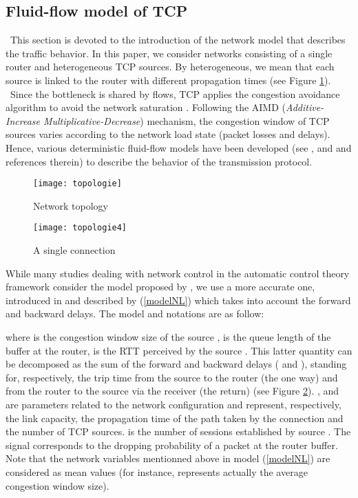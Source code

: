\documentclass[a4paper, 10pt, onecolumn]{article}
\begin{document}
\subsection{Fluid-flow model of TCP}
~\indent  This section is devoted to the introduction of the network model that describes the traffic behavior. In this paper, we consider networks consisting of a single router and  heterogeneous TCP sources. By heterogeneous, we mean that each source is linked to the router with different propagation times (see Figure \ref{topologie}).\\
~\indent Since the bottleneck is shared by  flows, TCP applies the congestion avoidance algorithm to avoid the network saturation \cite{Jac88}. Following the AIMD ({\it Additive-Increase Multiplicative-Decrease}) mechanism, the congestion window of TCP sources varies according to the network load state (packet losses and delays). Hence, various deterministic fluid-flow models have been developed (see \cite{Low02}, \cite{Mis00} and \cite{Sri04} and references therein) to describe the behavior of the transmission protocol.
\begin{figure}
\centerline{\texttt{[image: topologie]}}
       \caption{Network topology}
       \label{topologie}
       \end{figure}
\begin{figure}
        \centerline{\texttt{[image: topologie4]}}
       \caption{A single connection}
       \label{topologie4}
\end{figure}
While many studies dealing with network control in the automatic control theory framework consider the model proposed by \cite{Mis00}, we use a more accurate one, introduced in \cite{Low02} and described by  (\ref{modelNL}) which takes into account the forward and backward delays. The model and notations are as follow:

where   is the congestion window size of the source ,  is the queue length of the buffer at the router,  is the RTT perceived by the source . This latter quantity can be decomposed as the sum of the forward and backward delays ( and ), standing for, respectively, the trip time from the source  to the router (the one way) and from the router to the source via the receiver (the return) (see Figure \ref{topologie4}). ,  and  are parameters related to the network configuration and represent, respectively, the link capacity, the propagation time of the path taken by the connection  and the number of TCP sources.  is the number of sessions established by source . The signal  corresponds to the dropping probability of a packet at the router buffer. Note that the network variables mentionned above in model (\ref{modelNL}) are considered as mean values \cite{Low02} (for instance,  represents actually the average congestion window size).\\~\indent
\end{document}
